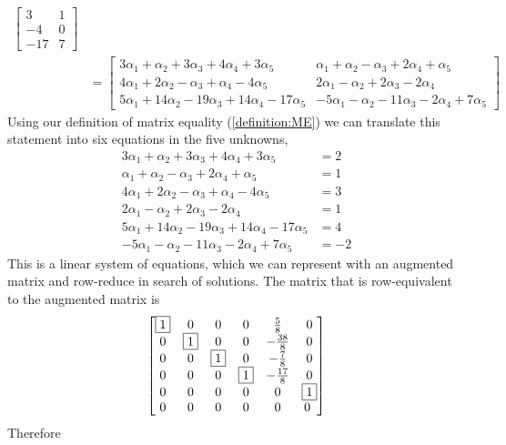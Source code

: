 \documentclass{ximera}
\begin{document}
\begin{example}[A subspace of $M_{32}$]
\begin{align*}
\begin{bmatrix}
                                                                                                                3 & 1 \\ -4 & 0 \\ -17 & 7
                                                                                                              \end{bmatrix}\\
    &=
      \begin{bmatrix}
        3\alpha_1 +\alpha_2 +3\alpha_3 +4\alpha_4 +3\alpha_5 &
        \alpha_1 +\alpha_2 -\alpha_3 +2\alpha_4 +\alpha_5\\
        4\alpha_1 +2\alpha_2 -\alpha_3 +\alpha_4 -4\alpha_5&
        2\alpha_1 -\alpha_2 +2\alpha_3 -2\alpha_4 \\
        5\alpha_1 +14\alpha_2 -19\alpha_3 +14\alpha_4 -17\alpha_5&
        -5\alpha_1 -\alpha_2 -11\alpha_3 -2\alpha_4 +7\alpha_5
      \end{bmatrix}
  \end{align*}
  Using our definition of matrix equality (\ref{definition:ME}) we can translate this statement into six equations in the five unknowns,
  \begin{align*}
    3\alpha_1 +\alpha_2 +3\alpha_3 +4\alpha_4 +3\alpha_5& =2\\
    \alpha_1 +\alpha_2 -\alpha_3 +2\alpha_4 +\alpha_5& =1\\
    4\alpha_1 +2\alpha_2 -\alpha_3 +\alpha_4 -4\alpha_5& =3\\
    2\alpha_1 -\alpha_2 +2\alpha_3 -2\alpha_4 & =1\\
    5\alpha_1 +14\alpha_2 -19\alpha_3 +14\alpha_4 -17\alpha_5& =4\\
    -5\alpha_1 -\alpha_2 -11\alpha_3 -2\alpha_4 +7\alpha_5&=-2
  \end{align*}
  This is a linear system of equations, which we can represent with an
  augmented matrix and row-reduce in search of solutions.  The matrix
  that is row-equivalent to the augmented matrix is
  \[
    \begin{bmatrix}
      \fbox{1} & 0 & 0 & 0 & \frac{5}{8} & 0\\
      0 & \fbox{1} & 0 & 0 & -\frac{38}{8} & 0\\
      0 & 0 & \fbox{1} & 0 & -\frac{7}{8} & 0\\
      0 & 0 & 0 & \fbox{1} & -\frac{17}{8} & 0\\
      0 & 0 & 0 & 0 & 0 & \fbox{1}\\
      0 & 0 & 0 & 0 & 0 & 0\
    \end{bmatrix}
  \]
  Therefore
  \begin{multipleChoice}
  \end{multipleChoice}
  

\end{example}
\end{document}

